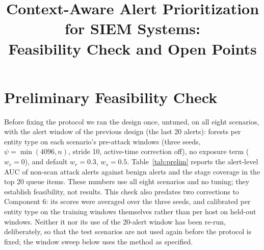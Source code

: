 \documentclass[conference]{IEEEtran}
\begin{document}
\title{Context-Aware Alert Prioritization for SIEM Systems:\\ Feasibility Check and Open Points}
\author{%
}
\maketitle

\section{Preliminary Feasibility Check}
\label{sec:prelim}

Before fixing the protocol we ran the design once, untuned, on all eight scenarios, with the alert window of the previous design (the last 20 alerts): forests per entity type on each scenario's pre-attack windows (three seeds, $\psi = \min(4096, n)$, stride 10, active-time correction off), no exposure term ($w_c = 0$), and default $w_r = 0.3$, $w_s = 0.5$. Table~\ref{tab:prelim} reports the alert-level AUC of non-scan attack alerts against benign alerts and the stage coverage in the top 20 queue items. These numbers use all eight scenarios and no tuning; they establish feasibility, not results. This check also predates two corrections to Component 6: its scores were averaged over the three seeds, and calibrated per entity type on the training windows themselves rather than per host on held-out windows. Neither it nor its use of the 20-alert window has been re-run, deliberately, so that the test scenarios are not used again before the protocol is fixed; the window sweep below uses the method as specified.
\end{document}
